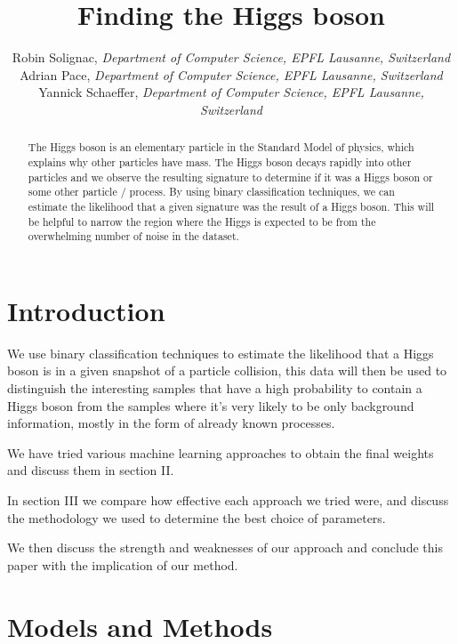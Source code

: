 \documentclass[10pt,conference,compsocconf]{IEEEtran}
\begin{document}
\title{Finding the Higgs boson}

\author{
  Robin Solignac,
  \textit{Department of Computer Science, EPFL Lausanne, Switzerland}\\
  Adrian Pace,
  \textit{Department of Computer Science, EPFL Lausanne, Switzerland}\\
  Yannick Schaeffer,
  \textit{Department of Computer Science, EPFL Lausanne, Switzerland}
}

\maketitle

\begin{abstract}
 The Higgs boson is an elementary particle in the Standard Model of physics, which explains why other particles have mass. The Higgs boson decays rapidly into other particles and we observe the resulting signature to determine if it was a Higgs boson or some other particle / process. By using binary classification techniques, we can estimate the likelihood that a given signature was the result of a Higgs boson. This will be helpful to narrow the region where the Higgs is expected to be from the overwhelming number of noise in the dataset.
\end{abstract}

\section{Introduction}
We use binary classification techniques to estimate the likelihood that a Higgs boson is in a given snapshot of a particle collision, this data will then be used to distinguish the interesting samples that have a high probability to contain a Higgs boson from the samples where it's very likely to be only background information, mostly in the form of already known processes.

We have tried various machine learning approaches to obtain the final weights and discuss them in section II.

In section III we compare how effective each approach we tried were, and discuss the methodology we used to determine the best choice of parameters.

We then discuss the strength and weaknesses of our approach and conclude this paper with the implication of our method.

\section{Models and Methods}
\end{document}
